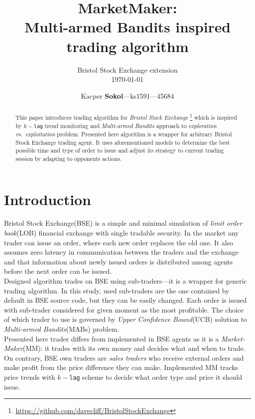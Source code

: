 \documentclass{llncs}
\begin{document}
\title{MarketMaker:\\Multi-armed Bandits inspired trading algorithm}
\subtitle{Bristol Stock Exchange extension\\[1em]\today}
\author{Kacper \textbf{Sokol}---ks1591---45684}
%
\maketitle
%

\begin{abstract}
This paper introduces trading algorithm for \emph{Bristol Stock Exchange}%
\footnote{\url{https://github.com/davecliff/BristolStockExchange}} %
which is inspired by $k-$\texttt{lag} trend monitoring and \emph{Multi-armed Bandits} approach to \emph{exploration vs.\ exploitation} problem. Presented here algorithm is a wrapper for arbitrary Bristol Stock Exchange trading agent. It uses aforementioned models to determine the best possible time and type of order to issue and adjust its strategy to current trading session by adapting to opponents actions.
\end{abstract}

\section{Introduction}
Bristol Stock Exchange(BSE) is a simple and minimal simulation of \emph{limit order book}(LOB) financial exchange with single tradable security. In the market any trader can issue an order, where each new order replaces the old one. It also assumes zero latency in communication between the traders and the exchange and that information about newly issued orders is distributed among agents before the next order can be issued.\\

Designed algorithm trades on BSE using sub-traders---it is a wrapper for generic trading algorithm. In this study, used sub-traders are the one contained by default in BSE source code, but they can be easily changed. Each order is issued with sub-trader considered for given moment as the most profitable. The choice of which trader to use is governed by \emph{Upper Confidence Bound}(UCB) solution to \emph{Multi-armed Bandits}(MABs) problem.\\
Presented here trader differs from implemented in BSE agents as it is a \emph{Market-Maker}(MM): it trades with its own money and decides what and when to trade. On contrary, BSE own traders are \emph{sales traders} who receive external orders and make profit from the price difference they can make. Implemented MM tracks price trends with $k-$\texttt{lag} scheme to decide what order type and price it should issue.\\
\end{document}
